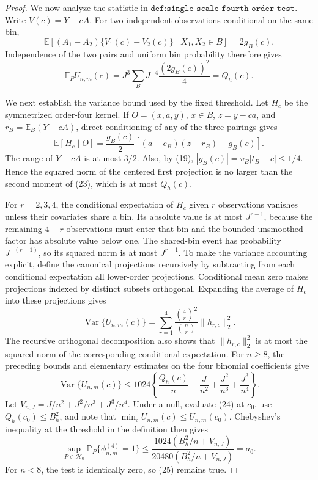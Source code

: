 \documentclass{article}
\begin{document}
\begin{proof}
We now analyze the statistic in \(\texttt{def:single-scale-fourth-order-test}\). Write \(V(c)=Y-cA\). For two independent observations conditional on the same bin,
\[
 \mathbb E[(A_1-A_2)\{V_1(c)-V_2(c)\}\mid X_1,X_2\in B]=2g_B(c).
\]
Independence of the two pairs and uniform bin probability therefore gives
\[
 \mathbb E_PU_{n,m}(c)
 =J^3\sum_BJ^{-4}\frac{(2g_B(c))^2}{4}=Q_h(c).                       \tag{22}
\]

We next establish the variance bound used by the fixed threshold. Let \(H_c\) be the symmetrized order-four kernel. If \(O=(x,a,y)\), \(x\in B\), \(z=y-ca\), and \(r_B=\mathbb E_B(Y-cA)\), direct conditioning of any of the three pairings gives
\[
 \mathbb E[H_c\mid O]
 =\frac{g_B(c)}2\left[(a-e_B)(z-r_B)+g_B(c)\right].                  \tag{23}
\]
The range of \(Y-cA\) is at most \(3/2\). Also, by (19), \(|g_B(c)|=v_B|t_B-c|\le1/4\). Hence the squared norm of the centered first projection is no larger than the second moment of (23), which is at most \(Q_h(c)\).

For \(r=2,3,4\), the conditional expectation of \(H_c\) given \(r\) observations vanishes unless their covariates share a bin. Its absolute value is at most \(J^{r-1}\), because the remaining \(4-r\) observations must enter that bin and the bounded unsmoothed factor has absolute value below one. The shared-bin event has probability \(J^{-(r-1)}\), so its squared norm is at most \(J^{r-1}\). To make the variance accounting explicit, define the canonical projections recursively by subtracting from each conditional expectation all lower-order projections. Conditional mean zero makes projections indexed by distinct subsets orthogonal. Expanding the average of \(H_c\) into these projections gives
\[
 \operatorname{Var}\{U_{n,m}(c)\}
 =\sum_{r=1}^4\frac{\binom4r^2}{\binom nr}\lVert h_{r,c}\rVert_2^2.
\]
The recursive orthogonal decomposition also shows that \(\lVert h_{r,c}\rVert_2^2\) is at most the squared norm of the corresponding conditional expectation. For \(n\ge8\), the preceding bounds and elementary estimates on the four binomial coefficients give
\[
 \operatorname{Var}\{U_{n,m}(c)\}
 \le1024\left\{\frac{Q_h(c)}n+\frac{J}{n^2}
 +\frac{J^2}{n^3}+\frac{J^3}{n^4}\right\}.                           \tag{24}
\]
Let \(V_{n,J}=J/n^2+J^2/n^3+J^3/n^4\). Under a null, evaluate (24) at \(c_0\), use \(Q_h(c_0)\le B_h^2\), and note that \(\min_cU_{n,m}(c)\le U_{n,m}(c_0)\). Chebyshev's inequality at the threshold in the definition then gives
\[
 \sup_{P\in\mathcal H_0}\mathbb P_P\{\phi_{n,m}^{(4)}=1\}
 \le\frac{1024(B_h^2/n+V_{n,J})}{20480(B_h^2/n+V_{n,J})}
 =a_0.                                                               \tag{25}
\]
For \(n<8\), the test is identically zero, so (25) remains true.


\end{proof}
\end{document}
